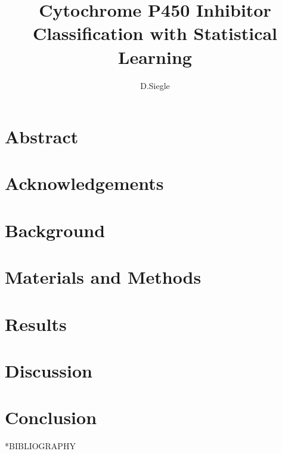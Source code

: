 \documentclass[12pt]{report}
\author{D.Siegle}
\title{Cytochrome P450 Inhibitor Classification with Statistical Learning}
\makeatletter
\renewcommand\part{%
  \if@openright
    \cleardoublepage
  \else
    \clearpage
  \fi
  \thispagestyle{empty}%
  \if@twocolumn
    \onecolumn
    \@tempswatrue
  \else
    \@tempswafalse
  \fi
  \null\vfil
  \secdef\@part\@spart}
\makeatother
\begin{document}


\begin{doublespacing}

\chapter*{Abstract}


\chapter*{Acknowledgements}
\setcounter{page}{2}


\end{doublespacing}

\tableofcontents
{}
\listoftables
{}
\listoffigures

\begin{doublespacing}

\chapter{Background}



\chapter{Materials and Methods}


\chapter{Results}
\thispagestyle{empty}




\chapter{Discussion}


\chapter{Conclusion}


\end{doublespacing}

\part*{BIBLIOGRAPHY}

{}

\end{document}
